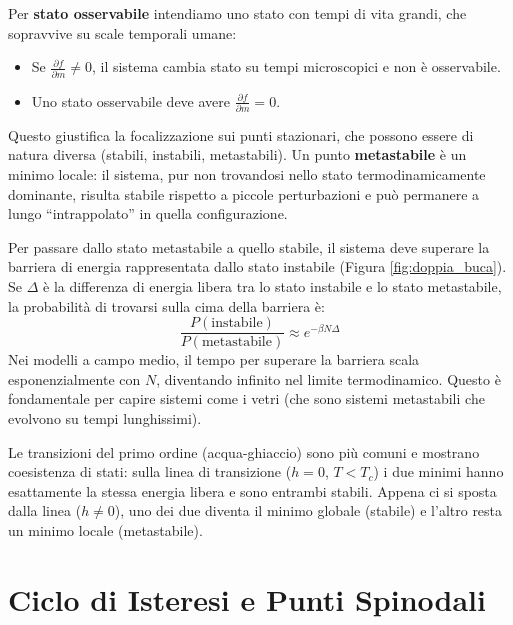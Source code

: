 \bigskip 


\noindent Per \textbf{stato osservabile} intendiamo uno stato con tempi di vita grandi, che sopravvive su scale temporali umane:
\begin{itemize}
    \item Se $\frac{\partial f }{ \partial m} \neq 0$, il sistema cambia stato su tempi microscopici e non è osservabile.
    \item Uno stato osservabile deve avere $\frac{\partial f }{ \partial m} = 0$.
\end{itemize}
Questo giustifica la focalizzazione sui punti stazionari, che possono essere di natura diversa (stabili, instabili, metastabili). Un punto \textbf{metastabile} è un minimo locale: il sistema, pur non trovandosi nello stato termodinamicamente dominante, risulta stabile rispetto a piccole perturbazioni e può permanere a lungo “intrappolato” in quella configurazione.


Per passare dallo stato metastabile a quello stabile, il sistema deve superare la barriera di energia rappresentata dallo stato instabile (Figura \ref{fig:doppia_buca}).
Se $\Delta$ è la differenza di energia libera tra lo stato instabile e lo stato metastabile, la probabilità di trovarsi sulla cima della barriera è:
\begin{equation}
    \frac{P(\text{instabile})}{P(\text{metastabile})} \approx e^{-\beta N \Delta}
\end{equation}
Nei modelli a campo medio, il tempo per superare la barriera scala esponenzialmente con $N$, diventando infinito nel limite termodinamico.
Questo è fondamentale per capire sistemi come i vetri (che sono sistemi metastabili che evolvono su tempi lunghissimi).

Le transizioni del primo ordine (acqua-ghiaccio) sono più comuni e mostrano coesistenza di stati: sulla linea di transizione ($h=0$, $T<T_c$) i due minimi hanno esattamente la stessa energia libera e sono entrambi stabili. Appena ci si sposta dalla linea ($h \neq 0$), uno dei due diventa il minimo globale (stabile) e l'altro resta un minimo locale (metastabile).

\newpage
\section{Ciclo di Isteresi e Punti Spinodali}

